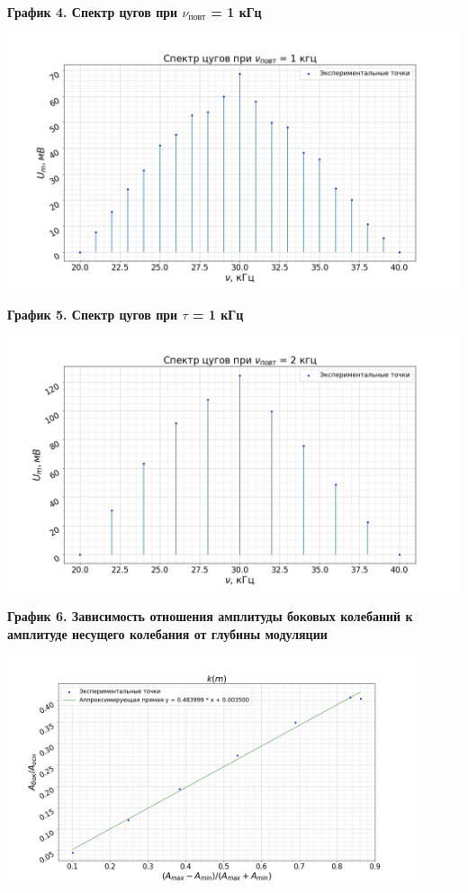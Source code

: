 \documentclass[15pt,a5paper,reqno]{article}
\begin{document}
        \noindent\hypertarget{graph_4}{\textbf{График 4. Спектр цугов при $\nu_{\text{повт}}$ = 1 кГц}}
        \begin{center}
            \includegraphics[width = \textwidth]{images/graph_4.png}
        \end{center}

        \noindent\hypertarget{graph_5}{\textbf{График 5. Спектр цугов при $\tau$ = 1 кГц}}
        \begin{center}
            \includegraphics[width = \textwidth]{images/graph_5.png}
        \end{center}

        \noindent\hypertarget{graph_6}{\textbf{График 6. Зависимость отношения амплитуды боковых колебаний к амплитуде несущего колебания от глубины модуляции}}
        \begin{center}
            \includegraphics[width = 0.9\textwidth]{images/graph_6.png}
        \end{center}
\end{document}
